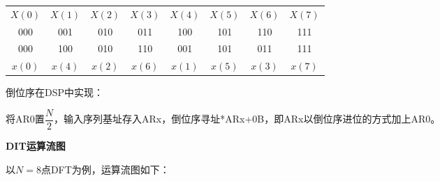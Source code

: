 \documentclass[cn, hazy, blue, normal, 14pt]{elegantnote}
\begin{document}
\begin{table}[htbp]
\centering
\begin{tabular}{|c|c|c|c|c|c|c|c|}
    $X(0)$ & $X(1)$ & $X(2)$ & $X(3)$ & $X(4)$ & $X(5)$ & $X(6)$ & $X(7)$ \\
    000 & 001 & 010 & 011 & 100 & 101 & 110 & 111 \\
    000 & 100 & 010 & 110 & 001 & 101 & 011 & 111 \\
    $x(0)$ & $x(4)$ & $x(2)$ & $x(6)$ & $x(1)$ & $x(5)$ & $x(3)$ & $x(7)$
\end{tabular}
\end{table}

倒位序在DSP中实现：

将AR0置$\dfrac{N}{2}$，输入序列基址存入ARx，倒位序寻址*ARx+0B，即ARx以倒位序进位的方式加上AR0。

\textbf{DIT运算流图}

以$N=8$点DFT为例，运算流图如下：
\end{document}
